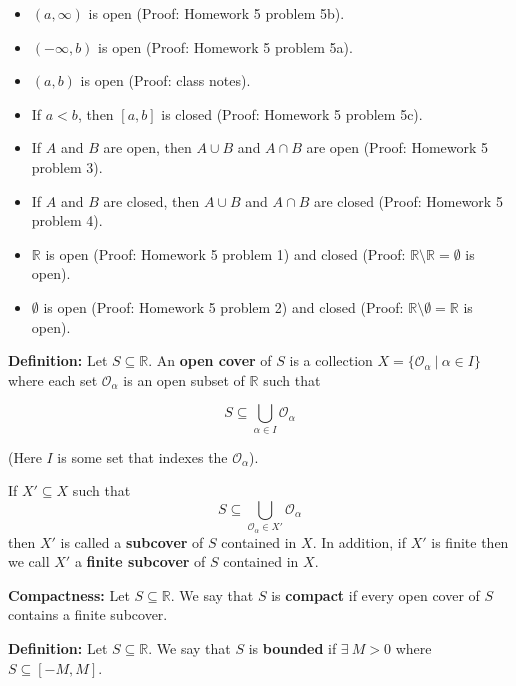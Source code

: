 \begin{itemize}

\item \((a, \infty)\) is open (Proof: Homework 5 problem 5b).

\item \((-\infty, b)\) is open (Proof: Homework 5 problem 5a).

\item \((a, b)\) is open (Proof: class notes).

\item If \(a < b\), then \([a, b]\) is closed (Proof: Homework 5 problem 5c).

\item If \(A\) and \(B\) are open, then \(A \cup B\) and \(A \cap B\) are open (Proof: Homework 5 problem 3).

\item If \(A\) and \(B\) are closed, then \(A \cup B\) and \(A \cap B\) are closed (Proof: Homework 5 problem 4).

\item \(\mathbb{R}\) is open (Proof: Homework 5 problem 1) and closed (Proof: \(\mathbb{R} \setminus \mathbb{R} = \emptyset\) is open).

\item \(\emptyset\) is open (Proof: Homework 5 problem 2) and closed (Proof: \(\mathbb{R} \setminus \emptyset = \mathbb{R}\) is open).

\end{itemize}

\textbf{Definition:} Let \(S \subseteq \mathbb{R}\). An \textbf{open cover} of \(S\) is a collection \(X = \{\mathcal{O}_\alpha \ | \ \alpha \in I \} \) where each set \(\mathcal{O}_\alpha\) is an open subset of \(\mathbb{R}\) such that

\[
S \subseteq \bigcup_{\alpha \in I} \mathcal{O}_\alpha
\]

(Here \(I\) is some set that indexes the \(\mathcal{O}_\alpha\)).

If \(X' \subseteq X\) such that \[S \subseteq  \bigcup_{\mathcal{O}_\alpha \in X'} \mathcal{O}_\alpha\]then \(X'\) is called a \textbf{subcover} of \(S\) contained in \(X\). In addition, if \(X'\) is finite then we call \(X'\) a \textbf{finite subcover} of \(S\) contained in \(X\).

\textbf{Compactness:} Let \(S \subseteq \mathbb{R}\). We say that \(S\) is \textbf{compact} if every open cover of \(S\) contains a finite subcover. 

\textbf{Definition:} Let \(S \subseteq \mathbb{R}\). We say that \(S\) is \textbf{bounded} if \(\exists \ M > 0\) where \(S \subseteq [-M, M]\).

